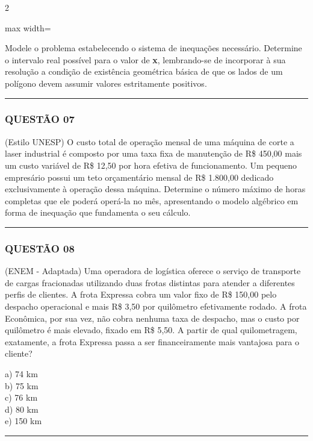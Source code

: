 \documentclass[11pt, a4paper]{article}
\begin{document}
\begin{multicols*}{2}
\begin{center}
\begin{adjustbox}{max width=\linewidth}
\begin{tikzpicture}
\end{tikzpicture}
\end{adjustbox}
\end{center}

Modele o problema estabelecendo o sistema de inequações necessário. Determine o intervalo real possível para o valor de \textbf{x}, lembrando-se de incorporar à sua resolução a condição de existência geométrica básica de que os lados de um polígono devem assumir valores estritamente positivos.

\vspace{0cm} \noindent\textcolor{CorLinha}{\rule{\linewidth}{0.5pt}} \vspace{-0.2cm}
\subsubsection*{QUESTÃO 07}
(Estilo UNESP) O custo total de operação mensal de uma máquina de corte a laser industrial é composto por uma taxa fixa de manutenção de R\$ 450,00 mais um custo variável de R\$ 12,50 por hora efetiva de funcionamento. Um pequeno empresário possui um teto orçamentário mensal de R\$ 1.800,00 dedicado exclusivamente à operação dessa máquina. Determine o número máximo de horas completas que ele poderá operá-la no mês, apresentando o modelo algébrico em forma de inequação que fundamenta o seu cálculo.

\vspace{0cm} \noindent\textcolor{CorLinha}{\rule{\linewidth}{0.5pt}} \vspace{-0.2cm}
\subsubsection*{QUESTÃO 08}
(ENEM - Adaptada) Uma operadora de logística oferece o serviço de transporte de cargas fracionadas utilizando duas frotas distintas para atender a diferentes perfis de clientes. A frota Expressa cobra um valor fixo de R\$ 150,00 pelo despacho operacional e mais R\$ 3,50 por quilômetro efetivamente rodado. A frota Econômica, por sua vez, não cobra nenhuma taxa de despacho, mas o custo por quilômetro é mais elevado, fixado em R\$ 5,50. A partir de qual quilometragem, exatamente, a frota Expressa passa a ser financeiramente mais vantajosa para o cliente?

a) 74 km\\[0.3cm]
b) 75 km\\[0.3cm]
c) 76 km\\[0.3cm]
d) 80 km\\[0.3cm]
e) 150 km\\
\vspace{0cm} \noindent\textcolor{CorLinha}{\rule{\linewidth}{0.5pt}} \vspace{-0.2cm}

\end{multicols*}
\end{document}
